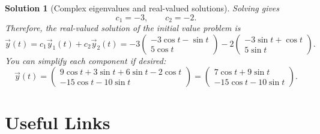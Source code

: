 \documentclass{article}
\newtheorem{solution}{Solution}
\begin{document}
\begin{solution}[Complex eigenvalues and real-valued solutions]
    Solving gives
    \[c_1 = -3, \qquad c_2 = -2.\]
    Therefore, the real-valued solution of the initial value problem is
    \[\vec y(t) = c_1 \vec y_1(t) + c_2 \vec y_2(t) = -3 \begin{pmatrix}-3\cos t - \sin t \\ 5 \cos t \end{pmatrix}-2 \begin{pmatrix}-3\sin t + \cos t \\ 5 \sin t \end{pmatrix}.\]
    You can simplify each component if desired:
    \[\vec y(t) = \begin{pmatrix}9\cos t + 3 \sin t + 6 \sin t - 2 \cos t \\ -15 \cos t - 10 \sin t\end{pmatrix} = \begin{pmatrix}7 \cos t + 9 \sin t \\ -15 \cos t - 10 \sin t\end{pmatrix}.\]
\end{solution}

\section{Useful Links}
\end{document}
